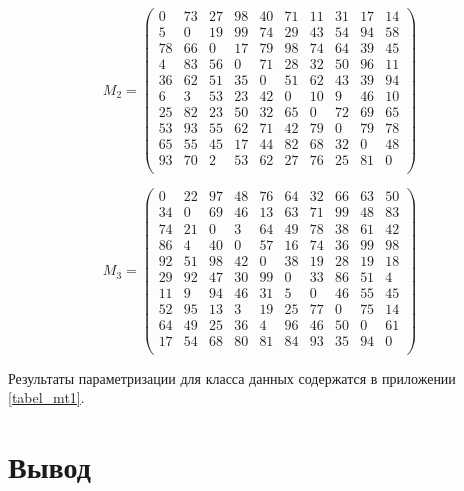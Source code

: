 \begin{equation}
	\label{eq:mt2}
	M_2 = 
	\begin{pmatrix}
		0 & 73 & 27 & 98 & 40 & 71 & 11 & 31 & 17 & 14 \\
		5 & 0 & 19 & 99 & 74 & 29 & 43 & 54 & 94 & 58 \\
		78 & 66 & 0 & 17 & 79 & 98 & 74 & 64 & 39 & 45 \\
		4 & 83 & 56 & 0 & 71 & 28 & 32 & 50 & 96 & 11 \\
		36 & 62 & 51 & 35 & 0 & 51 & 62 & 43 & 39 & 94 \\
		6 & 3 & 53 & 23 & 42 & 0 & 10 & 9 & 46 & 10 \\
		25 & 82 & 23 & 50 & 32 & 65 & 0 & 72 & 69 & 65 \\
		53 & 93 & 55 & 62 & 71 & 42 & 79 & 0 & 79 & 78 \\
		65 & 55 & 45 & 17 & 44 & 82 & 68 & 32 & 0 & 48 \\
		93 & 70 & 2 & 53 & 62 & 27 & 76 & 25 & 81 & 0 \\
	\end{pmatrix}
\end{equation}

\begin{equation}
	\label{eq:mt3}
	M_3 = 
	\begin{pmatrix}
		0 & 22 & 97 & 48 & 76 & 64 & 32 & 66 & 63 & 50 \\
		34 & 0 & 69 & 46 & 13 & 63 & 71 & 99 & 48 & 83 \\
		74 & 21 & 0 & 3 & 64 & 49 & 78 & 38 & 61 & 42 \\
		86 & 4 & 40 & 0 & 57 & 16 & 74 & 36 & 99 & 98 \\
		92 & 51 & 98 & 42 & 0 & 38 & 19 & 28 & 19 & 18 \\
		29 & 92 & 47 & 30 & 99 & 0 & 33 & 86 & 51 & 4 \\
		11 & 9 & 94 & 46 & 31 & 5 & 0 & 46 & 55 & 45 \\
		52 & 95 & 13 & 3 & 19 & 25 & 77 & 0 & 75 & 14 \\
		64 & 49 & 25 & 36 & 4 & 96 & 46 & 50 & 0 & 61 \\
		17 & 54 & 68 & 80 & 81 & 84 & 93 & 35 & 94 & 0 \\
	\end{pmatrix}
\end{equation}


Результаты параметризации для  класса данных содержатся в приложении \ref{tabel_mt1}.


\section*{Вывод}

